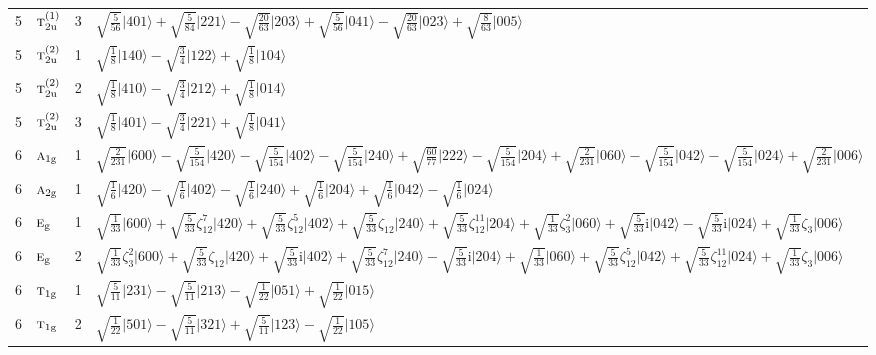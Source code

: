 \documentclass[11pt]{article}
\newcommand{\irr}[1]{\text{\normalfont\scshape #1}}
\newcommand{\ptag}[1]{\mathrm{#1}}
\newcommand{\iunit}{\mathrm{i}}
\newcommand{\rootunity}[1]{\zeta_{#1}}
\newcommand{\occ}[1]{\lvert #1\rangle}
\begin{document}
\begin{longtable}{c l c p{}}
5 & $\irr{t}_{2\ptag{u}}^{(1)}$ & 3 & $\sqrt{\tfrac{5}{56}}\occ{401}+\sqrt{\tfrac{5}{84}}\occ{221}-\sqrt{\tfrac{20}{63}}\occ{203}+\sqrt{\tfrac{5}{56}}\occ{041}-\sqrt{\tfrac{20}{63}}\occ{023}+\sqrt{\tfrac{8}{63}}\occ{005}$\\
5 & $\irr{t}_{2\ptag{u}}^{(2)}$ & 1 & $\sqrt{\tfrac{1}{8}}\occ{140}-\sqrt{\tfrac{3}{4}}\occ{122}+\sqrt{\tfrac{1}{8}}\occ{104}$\\
5 & $\irr{t}_{2\ptag{u}}^{(2)}$ & 2 & $\sqrt{\tfrac{1}{8}}\occ{410}-\sqrt{\tfrac{3}{4}}\occ{212}+\sqrt{\tfrac{1}{8}}\occ{014}$\\
5 & $\irr{t}_{2\ptag{u}}^{(2)}$ & 3 & $\sqrt{\tfrac{1}{8}}\occ{401}-\sqrt{\tfrac{3}{4}}\occ{221}+\sqrt{\tfrac{1}{8}}\occ{041}$\\
\hline
6 & $\irr{a}_{1\ptag{g}}$ & 1 & $\sqrt{\tfrac{2}{231}}\occ{600}-\sqrt{\tfrac{5}{154}}\occ{420}-\sqrt{\tfrac{5}{154}}\occ{402}-\sqrt{\tfrac{5}{154}}\occ{240}+\sqrt{\tfrac{60}{77}}\occ{222}-\sqrt{\tfrac{5}{154}}\occ{204}+\sqrt{\tfrac{2}{231}}\occ{060}-\sqrt{\tfrac{5}{154}}\occ{042}-\sqrt{\tfrac{5}{154}}\occ{024}+\sqrt{\tfrac{2}{231}}\occ{006}$\\
6 & $\irr{a}_{2\ptag{g}}$ & 1 & $\sqrt{\tfrac{1}{6}}\occ{420}-\sqrt{\tfrac{1}{6}}\occ{402}-\sqrt{\tfrac{1}{6}}\occ{240}+\sqrt{\tfrac{1}{6}}\occ{204}+\sqrt{\tfrac{1}{6}}\occ{042}-\sqrt{\tfrac{1}{6}}\occ{024}$\\
6 & $\irr{e}_{\ptag{g}}$ & 1 & $\sqrt{\tfrac{1}{33}}\occ{600}+\sqrt{\tfrac{5}{33}}\rootunity{12}^{7}\occ{420}+\sqrt{\tfrac{5}{33}}\rootunity{12}^{5}\occ{402}+\sqrt{\tfrac{5}{33}}\rootunity{12}\occ{240}+\sqrt{\tfrac{5}{33}}\rootunity{12}^{11}\occ{204}+\sqrt{\tfrac{1}{33}}\rootunity{3}^{2}\occ{060}+\sqrt{\tfrac{5}{33}}\iunit\occ{042}-\sqrt{\tfrac{5}{33}}\iunit\occ{024}+\sqrt{\tfrac{1}{33}}\rootunity{3}\occ{006}$\\
6 & $\irr{e}_{\ptag{g}}$ & 2 & $\sqrt{\tfrac{1}{33}}\rootunity{3}^{2}\occ{600}+\sqrt{\tfrac{5}{33}}\rootunity{12}\occ{420}+\sqrt{\tfrac{5}{33}}\iunit\occ{402}+\sqrt{\tfrac{5}{33}}\rootunity{12}^{7}\occ{240}-\sqrt{\tfrac{5}{33}}\iunit\occ{204}+\sqrt{\tfrac{1}{33}}\occ{060}+\sqrt{\tfrac{5}{33}}\rootunity{12}^{5}\occ{042}+\sqrt{\tfrac{5}{33}}\rootunity{12}^{11}\occ{024}+\sqrt{\tfrac{1}{33}}\rootunity{3}\occ{006}$\\
6 & $\irr{t}_{1\ptag{g}}$ & 1 & $\sqrt{\tfrac{5}{11}}\occ{231}-\sqrt{\tfrac{5}{11}}\occ{213}-\sqrt{\tfrac{1}{22}}\occ{051}+\sqrt{\tfrac{1}{22}}\occ{015}$\\
6 & $\irr{t}_{1\ptag{g}}$ & 2 & $\sqrt{\tfrac{1}{22}}\occ{501}-\sqrt{\tfrac{5}{11}}\occ{321}+\sqrt{\tfrac{5}{11}}\occ{123}-\sqrt{\tfrac{1}{22}}\occ{105}$\\

\end{longtable}
\end{document}
